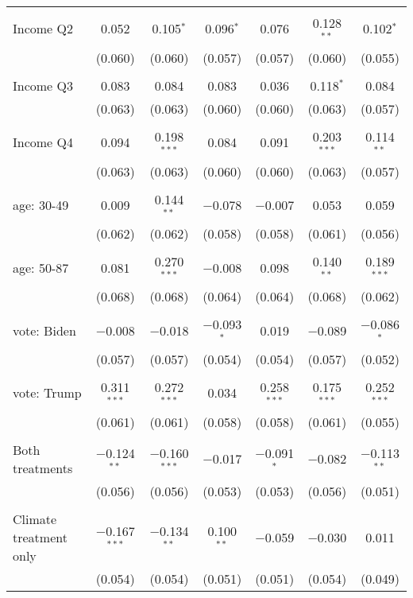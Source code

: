 \begin{tabular}{@{\extracolsep{5pt}}lcccccc}
  & & & & & & \\ 
 Income Q2 & 0.052 & 0.105$^{*}$ & 0.096$^{*}$ & 0.076 & 0.128$^{**}$ & 0.102$^{*}$ \\ 
  & (0.060) & (0.060) & (0.057) & (0.057) & (0.060) & (0.055) \\ 
  & & & & & & \\ 
 Income Q3 & 0.083 & 0.084 & 0.083 & 0.036 & 0.118$^{*}$ & 0.084 \\ 
  & (0.063) & (0.063) & (0.060) & (0.060) & (0.063) & (0.057) \\ 
  & & & & & & \\ 
 Income Q4 & 0.094 & 0.198$^{***}$ & 0.084 & 0.091 & 0.203$^{***}$ & 0.114$^{**}$ \\ 
  & (0.063) & (0.063) & (0.060) & (0.060) & (0.063) & (0.057) \\ 
  & & & & & & \\ 
 age: 30-49 & 0.009 & 0.144$^{**}$ & $-$0.078 & $-$0.007 & 0.053 & 0.059 \\ 
  & (0.062) & (0.062) & (0.058) & (0.058) & (0.061) & (0.056) \\ 
  & & & & & & \\ 
 age: 50-87 & 0.081 & 0.270$^{***}$ & $-$0.008 & 0.098 & 0.140$^{**}$ & 0.189$^{***}$ \\ 
  & (0.068) & (0.068) & (0.064) & (0.064) & (0.068) & (0.062) \\ 
  & & & & & & \\ 
 vote: Biden & $-$0.008 & $-$0.018 & $-$0.093$^{*}$ & 0.019 & $-$0.089 & $-$0.086$^{*}$ \\ 
  & (0.057) & (0.057) & (0.054) & (0.054) & (0.057) & (0.052) \\ 
  & & & & & & \\ 
 vote: Trump & 0.311$^{***}$ & 0.272$^{***}$ & 0.034 & 0.258$^{***}$ & 0.175$^{***}$ & 0.252$^{***}$ \\ 
  & (0.061) & (0.061) & (0.058) & (0.058) & (0.061) & (0.055) \\ 
  & & & & & & \\ 
 Both treatments & $-$0.124$^{**}$ & $-$0.160$^{***}$ & $-$0.017 & $-$0.091$^{*}$ & $-$0.082 & $-$0.113$^{**}$ \\ 
  & (0.056) & (0.056) & (0.053) & (0.053) & (0.056) & (0.051) \\ 
  & & & & & & \\ 
 Climate treatment only & $-$0.167$^{***}$ & $-$0.134$^{**}$ & 0.100$^{**}$ & $-$0.059 & $-$0.030 & 0.011 \\ 
  & (0.054) & (0.054) & (0.051) & (0.051) & (0.054) & (0.049) \\ 

\end{tabular}
